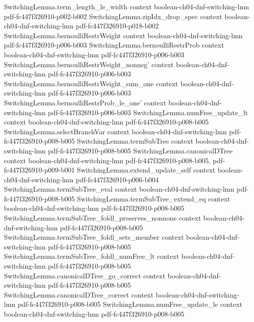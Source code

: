 \begin{theorem}
  {SwitchingLemma.term_length_le_width}
  {context}
  {boolean-ch04-dnf-switching-lmn}
  {pdf-fc447f326910-p002-b002}
\proofstep
  {SwitchingLemma.zipIdx_drop_spec}
  {context}
  {boolean-ch04-dnf-switching-lmn}
  {pdf-fc447f326910-p018-b002}
\proofstep
  {SwitchingLemma.bernoulliRestrWeight}
  {context}
  {boolean-ch04-dnf-switching-lmn}
  {pdf-fc447f326910-p006-b003}
\proofstep
  {SwitchingLemma.bernoulliRestrProb}
  {context}
  {boolean-ch04-dnf-switching-lmn}
  {pdf-fc447f326910-p006-b003}
\proofstep
  {SwitchingLemma.bernoulliRestrWeight_nonneg'}
  {context}
  {boolean-ch04-dnf-switching-lmn}
  {pdf-fc447f326910-p006-b003}
\proofstep
  {SwitchingLemma.bernoulliRestrWeight_sum_one}
  {context}
  {boolean-ch04-dnf-switching-lmn}
  {pdf-fc447f326910-p006-b003}
\proofstep
  {SwitchingLemma.bernoulliRestrProb_le_one'}
  {context}
  {boolean-ch04-dnf-switching-lmn}
  {pdf-fc447f326910-p006-b003}
\proofstep
  {SwitchingLemma.numFree_update_lt}
  {context}
  {boolean-ch04-dnf-switching-lmn}
  {pdf-fc447f326910-p008-b005}
\proofstep
  {SwitchingLemma.selectBranchVar}
  {context}
  {boolean-ch04-dnf-switching-lmn}
  {pdf-fc447f326910-p008-b005}
\proofstep
  {SwitchingLemma.termSubTree}
  {context}
  {boolean-ch04-dnf-switching-lmn}
  {pdf-fc447f326910-p008-b005}
\proofstep
  {SwitchingLemma.canonicalDTree}
  {context}
  {boolean-ch04-dnf-switching-lmn}
  {pdf-fc447f326910-p008-b005,
    pdf-fc447f326910-p009-b001}
\proofstep
  {SwitchingLemma.extend_update_self}
  {context}
  {boolean-ch04-dnf-switching-lmn}
  {pdf-fc447f326910-p006-b004}
\proofstep
  {SwitchingLemma.termSubTree_eval}
  {context}
  {boolean-ch04-dnf-switching-lmn}
  {pdf-fc447f326910-p008-b005}
\proofstep
  {SwitchingLemma.termSubTree_extend_eq}
  {context}
  {boolean-ch04-dnf-switching-lmn}
  {pdf-fc447f326910-p008-b005}
\proofstep
  {SwitchingLemma.termSubTree_foldl_preserves_nonnone}
  {context}
  {boolean-ch04-dnf-switching-lmn}
  {pdf-fc447f326910-p008-b005}
\proofstep
  {SwitchingLemma.termSubTree_foldl_sets_member}
  {context}
  {boolean-ch04-dnf-switching-lmn}
  {pdf-fc447f326910-p008-b005}
\proofstep
  {SwitchingLemma.termSubTree_foldl_numFree_lt}
  {context}
  {boolean-ch04-dnf-switching-lmn}
  {pdf-fc447f326910-p008-b005}
\proofstep
  {SwitchingLemma.canonicalDTree_go_correct}
  {context}
  {boolean-ch04-dnf-switching-lmn}
  {pdf-fc447f326910-p008-b005}
\proofstep
  {SwitchingLemma.canonicalDTree_correct}
  {context}
  {boolean-ch04-dnf-switching-lmn}
  {pdf-fc447f326910-p008-b005}
\proofstep
  {SwitchingLemma.numFree_update_le}
  {context}
  {boolean-ch04-dnf-switching-lmn}
  {pdf-fc447f326910-p008-b005}

\end{theorem}

